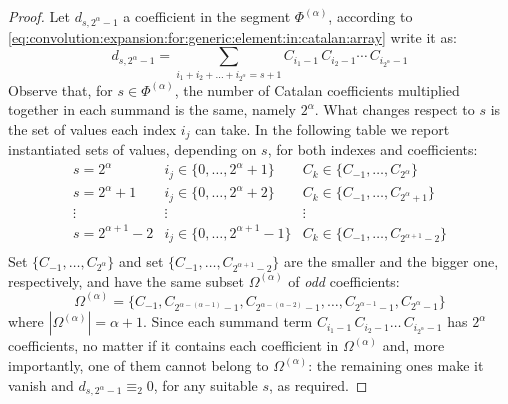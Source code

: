 \begin{proof}
Let $d_{s,2^{\alpha}-1}$ a coefficient in the segment $\Phi^{(\alpha)}$,
according to \autoref{eq:convolution:expansion:for:generic:element:in:catalan:array}
write it as:
\begin{displaymath}
    d_{s, 2^{\alpha}-1} = \sum_{i_{1}+i_{2}+\ldots+i_{2^{\alpha}}=s+1}
        {C_{i_{1}-1}\,C_{i_{2}-1}\cdots\,C_{i_{2^{\alpha}}-1}}
\end{displaymath}
Observe that, for $s\in\Phi^{(\alpha)}$, the number of Catalan
coefficients multiplied together in each summand is the same, namely
$2^{\alpha}$.  What changes respect to $s$ is the set of values each
index $i_{j}$ can take. In the following table we report instantiated sets
of values, depending on $s$, for both indexes and coefficients:
\begin{displaymath}
    \begin{array}{c|c|c}
        s = 2^{\alpha}
            & i_{j}\in\lbrace0,\ldots,2^{\alpha}+1\rbrace
            & C_{k}\in\lbrace C_{-1},\ldots,C_{2^{\alpha}}\rbrace\\
        s = 2^{\alpha} +1
            & i_{j}\in\lbrace0,\ldots,2^{\alpha}+2\rbrace
            & C_{k}\in\lbrace C_{-1},\ldots,C_{2^{\alpha}+1}\rbrace\\
        \vdots & \vdots&\vdots \\
        s = 2^{\alpha+1} -2
            & i_{j}\in\lbrace0,\ldots,2^{\alpha+1}-1\rbrace
            & C_{k}\in\lbrace C_{-1},\ldots,C_{2^{\alpha+1}-2}\rbrace\\
    \end{array}
\end{displaymath}
Set $\lbrace C_{-1},\ldots,C_{2^{\alpha}}\rbrace$ and set
$\lbrace C_{-1},\ldots,C_{2^{\alpha+1}-2}\rbrace$ are the smaller and the bigger one, respectively, and
have the same subset $\Omega^{(\alpha)}$ of \emph{odd} coefficients:
\begin{displaymath}
    \Omega^{(\alpha)}=\lbrace C_{-1}, C_{2^{\alpha-(\alpha-1)}-1},C_{2^{\alpha-(\alpha-2)}-1},\ldots,
        C_{2^{\alpha-1}-1},C_{2^{\alpha}-1}\rbrace
\end{displaymath}
where $\left|\Omega^{(\alpha)}\right|=\alpha+1$.
Since each summand term $C_{i_{1}-1}\,C_{i_{2}-1}\ldots\,C_{i_{2^{\alpha}}-1}$
has $2^{\alpha}$ coefficients, no matter if it contains each coefficient in $\Omega^{(\alpha)}$ and,
more importantly, one of them cannot belong to $\Omega^{(\alpha)}$:
the remaining ones make it vanish and $d_{s, 2^{\alpha}-1} \equiv_{2} 0$, for any suitable $s$,
as required.

\end{proof}

